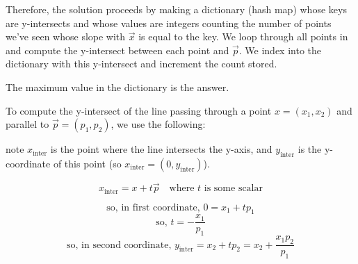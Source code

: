 \begin{prob}
\begin{soln}
        Therefore, the solution proceeds by making a dictionary (hash map)
        whose keys are y-intersects and whose values are integers counting the number of points
        we've seen whose slope with $\vec x$ is equal to the key. We loop through all
        points in  and compute the y-intersect between each point and $\vec p$.
        We index into the dictionary with this y-intersect and increment the count
        stored. 

        The maximum value in the dictionary is the answer.

        To compute the y-intersect of the line passing through a point $x = (x_1, x_2)$ and parallel to $\vec p = (p_1, p_2)$, we use the following:

        note $x_\text{inter}$ is the point where the line intersects the y-axis, and $y_\text{inter}$ is the y-coordinate of this point (so $x_\text{inter} = (0, y_\text{inter})$).

        \[
            x_\text{inter} = x + t \vec p \quad \text{where }  t \text{ is some scalar}
        \]
        
        \[\text{so, in first coordinate, } 0 = x_1 + t p_1\] 
        \[\text{so, } t = - \frac{x_1}{p_1}\] 
        \[\text{so, in second coordinate, } y_\text{inter} = x_2 + t p_2 = x_2 + \frac{x_1 p_2}{p_1}\]

        \inputminted{python}{\thisdir/include-solution/max_points_on_line.py}
    \end{soln}

\end{prob}
